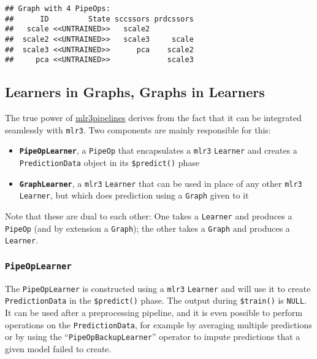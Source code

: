 \documentclass[
]{scrbook}
\providecommand{\tightlist}{%
  \setlength{\itemsep}{0pt}\setlength{\parskip}{0pt}}
\begin{document}
\begin{verbatim}
## Graph with 4 PipeOps:
##      ID         State sccssors prdcssors
##   scale <<UNTRAINED>>   scale2          
##  scale2 <<UNTRAINED>>   scale3     scale
##  scale3 <<UNTRAINED>>      pca    scale2
##     pca <<UNTRAINED>>             scale3
\end{verbatim}

\hypertarget{learners-in-graphs-graphs-in-learners}{%
\subsection{Learners in Graphs, Graphs in Learners}\label{learners-in-graphs-graphs-in-learners}}

The true power of \href{https://cran.r-project.org/package=mlr3pipelines}{mlr3pipelines} derives from the fact that it can be integrated seamlessly with \texttt{mlr3}.
Two components are mainly responsible for this:

\begin{itemize}
\tightlist
\item
  \textbf{\texttt{PipeOpLearner}}, a \texttt{PipeOp} that encapsulates a \texttt{mlr3} \texttt{Learner} and creates a \texttt{PredictionData} object in its \texttt{\$predict()} phase
\item
  \textbf{\texttt{GraphLearner}}, a \texttt{mlr3} \texttt{Learner} that can be used in place of any other \texttt{mlr3} \texttt{Learner}, but which does prediction using a \texttt{Graph} given to it
\end{itemize}

Note that these are dual to each other: One takes a \texttt{Learner} and produces a \texttt{PipeOp} (and by extension a \texttt{Graph}); the other takes a \texttt{Graph} and produces a \texttt{Learner}.

\hypertarget{pipeoplearner}{%
\subsubsection{\texorpdfstring{\texttt{PipeOpLearner}}{PipeOpLearner}}\label{pipeoplearner}}

The \texttt{PipeOpLearner} is constructed using a \texttt{mlr3} \texttt{Learner} and will use it to create \texttt{PredictionData} in the \texttt{\$predict()} phase.
The output during \texttt{\$train()} is \texttt{NULL}.
It can be used after a preprocessing pipeline, and it is even possible to perform operations on the \texttt{PredictionData}, for example by averaging multiple predictions or by using the ``\texttt{PipeOpBackupLearner}'' operator to impute predictions that a given model failed to create.
\end{document}
